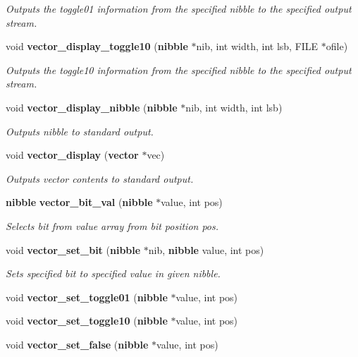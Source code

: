\begin{CompactItemize}
\begin{CompactList}\small\item\em Outputs the toggle01 information from the specified nibble to the specified output stream.\item\end{CompactList}\item 
void {\bf vector\_\-display\_\-toggle10} ({\bf nibble} $\ast$nib, int width, int lsb, FILE $\ast$ofile)
\begin{CompactList}\small\item\em Outputs the toggle10 information from the specified nibble to the specified output stream.\item\end{CompactList}\item 
void {\bf vector\_\-display\_\-nibble} ({\bf nibble} $\ast$nib, int width, int lsb)
\begin{CompactList}\small\item\em Outputs nibble to standard output.\item\end{CompactList}\item 
void {\bf vector\_\-display} ({\bf vector} $\ast$vec)
\begin{CompactList}\small\item\em Outputs vector contents to standard output.\item\end{CompactList}\item 
{\bf nibble} {\bf vector\_\-bit\_\-val} ({\bf nibble} $\ast$value, int pos)
\begin{CompactList}\small\item\em Selects bit from value array from bit position pos.\item\end{CompactList}\item 
void {\bf vector\_\-set\_\-bit} ({\bf nibble} $\ast$nib, {\bf nibble} value, int pos)
\begin{CompactList}\small\item\em Sets specified bit to specified value in given nibble.\item\end{CompactList}\item 
void {\bf vector\_\-set\_\-toggle01} ({\bf nibble} $\ast$value, int pos)
\item 
void {\bf vector\_\-set\_\-toggle10} ({\bf nibble} $\ast$value, int pos)
\item 
void {\bf vector\_\-set\_\-false} ({\bf nibble} $\ast$value, int pos)

\end{CompactItemize}
